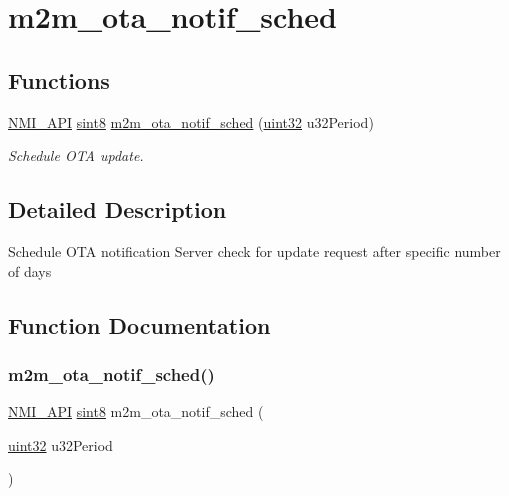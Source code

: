 \hypertarget{group__OtaSched}{}\section{m2m\+\_\+ota\+\_\+notif\+\_\+sched}
\label{group__OtaSched}
\subsection*{Functions}
\begin{DoxyCompactItemize}
\item 
\hyperlink{group__BSPDefine_gaecc0323d771e41ef81a76b5f12783e22}{N\+M\+I\+\_\+\+A\+PI} \hyperlink{group__DataT_gae35f10ffd0ac8dd2bc3e794da9bdfbc7}{sint8} \hyperlink{group__OtaSched_ga5dab33fa39bd9aa510b482ccd4226f81}{m2m\+\_\+ota\+\_\+notif\+\_\+sched} (\hyperlink{group__DataT_ga100e7c691a47d6978527c479a0158245}{uint32} u32\+Period)
\begin{DoxyCompactList}\small\item\em Schedule O\+TA update. \end{DoxyCompactList}\end{DoxyCompactItemize}


\subsection{Detailed Description}
Schedule O\+TA notification Server check for update request after specific number of days 

\subsection{Function Documentation}
\mbox{\label{group__OtaSched_ga5dab33fa39bd9aa510b482ccd4226f81}} 
\subsubsection{\texorpdfstring{m2m\+\_\+ota\+\_\+notif\+\_\+sched()}{m2m\_ota\_notif\_sched()}}
{\footnotesize\ttfamily \hyperlink{group__BSPDefine_gaecc0323d771e41ef81a76b5f12783e22}{N\+M\+I\+\_\+\+A\+PI} \hyperlink{group__DataT_gae35f10ffd0ac8dd2bc3e794da9bdfbc7}{sint8} m2m\+\_\+ota\+\_\+notif\+\_\+sched (\begin{DoxyParamCaption}\item[{\hyperlink{group__DataT_ga100e7c691a47d6978527c479a0158245}{uint32}}]{u32\+Period }\end{DoxyParamCaption})}



